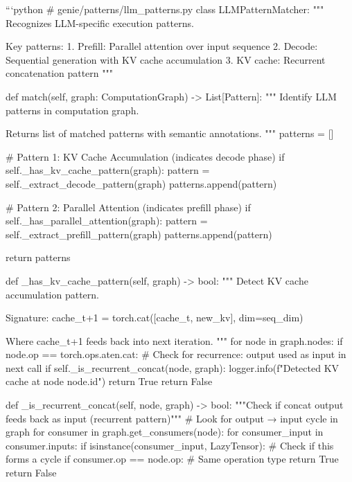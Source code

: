 ```python
# genie/patterns/llm_patterns.py
class LLMPatternMatcher:
    """
    Recognizes LLM-specific execution patterns.
    
    Key patterns:
    1. Prefill: Parallel attention over input sequence
    2. Decode: Sequential generation with KV cache accumulation
    3. KV cache: Recurrent concatenation pattern
    """
    
    def match(self, graph: ComputationGraph) -> List[Pattern]:
        """
        Identify LLM patterns in computation graph.
        
        Returns list of matched patterns with semantic annotations.
        """
        patterns = []
        
        # Pattern 1: KV Cache Accumulation (indicates decode phase)
        if self._has_kv_cache_pattern(graph):
            pattern = self._extract_decode_pattern(graph)
            patterns.append(pattern)
        
        # Pattern 2: Parallel Attention (indicates prefill phase)
        if self._has_parallel_attention(graph):
            pattern = self._extract_prefill_pattern(graph)
            patterns.append(pattern)
        
        return patterns
    
    def _has_kv_cache_pattern(self, graph) -> bool:
        """
        Detect KV cache accumulation pattern.
        
        Signature:
            cache_t+1 = torch.cat([cache_t, new_kv], dim=seq_dim)
        
        Where cache_t+1 feeds back into next iteration.
        """
        for node in graph.nodes:
            if node.op == torch.ops.aten.cat:
                # Check for recurrence: output used as input in next call
                if self._is_recurrent_concat(node, graph):
                    logger.info(f"Detected KV cache at node {node.id}")
                    return True
        return False
    
    def _is_recurrent_concat(self, node, graph) -> bool:
        """Check if concat output feeds back as input (recurrent pattern)"""
        # Look for output → input cycle in graph
        for consumer in graph.get_consumers(node):
            for consumer_input in consumer.inputs:
                if isinstance(consumer_input, LazyTensor):
                    # Check if this forms a cycle
                    if consumer.op == node.op:  # Same operation type
                        return True
        return False
    
